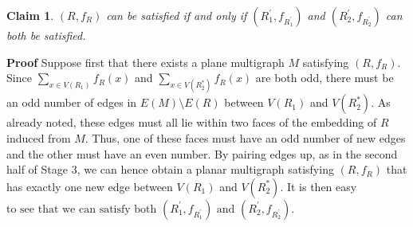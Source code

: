 \documentclass{article}
\newtheorem{Proof of Theorem}{Proof of Theorem}
\newtheorem{Claim}[Theorem]{Claim}
\begin{document}
\begin{Claim}
$(R,f_{R})$ can be satisfied if and only if
$\left( R_{1}^{\prime},f_{R_{1}^{\prime}} \right)$ and $\left( R_{2}^{\prime},f_{R_{2}^{\prime}} \right)$ 
can both be satisfied.
\end{Claim}
\textbf{Proof}
Suppose first that there exists a plane multigraph $M$ satisfying $(R,f_{R})$.
Since $\sum_{x \in V(R_{1})} f_{R}(x)$ and $\sum_{x \in V \left( R_{2}^{*} \right) } f_{R}(x)$ are both odd,
there must be an odd number of edges in $E(M) \setminus E(R)$ between $V(R_{1})$ and $V(R_{2}^{*})$.
As already noted,
these edges must all lie within two faces of the embedding of $R$ induced from $M$.
Thus, one of these faces must have an odd number of new edges 
and the other must have an even number.
By pairing edges up,
as in the second half of Stage $3$,
we can hence obtain a planar multigraph satisfying $(R,f_{R})$ 
that has exactly one new edge between $V(R_{1})$ and $V(R_{2}^{*})$.
It is then easy $\textrm{to see that we can satisfy both 
$\left( R_{1}^{\prime},f_{R_{1}^{\prime}} \right)$ and $\left( R_{2}^{\prime},f_{R_{2}^{\prime}} \right)$.}$
\end{document}
